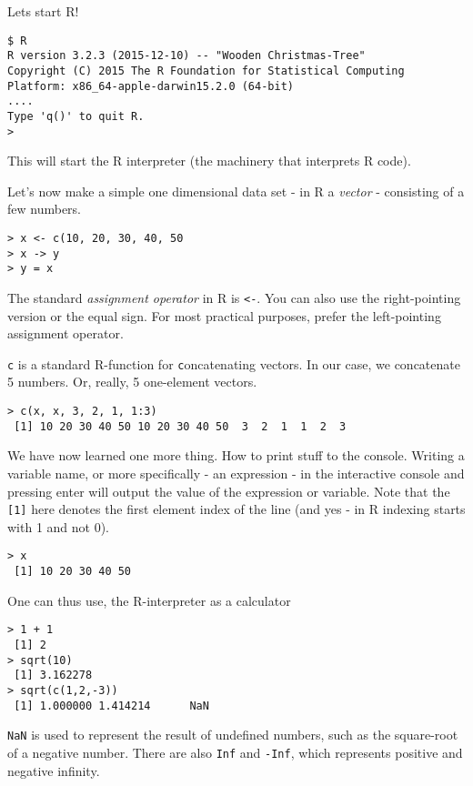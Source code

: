 \documentclass{article}[11pt]
\begin{document}
Lets start R!

\begin{verbatim}
$ R
R version 3.2.3 (2015-12-10) -- "Wooden Christmas-Tree"
Copyright (C) 2015 The R Foundation for Statistical Computing
Platform: x86_64-apple-darwin15.2.0 (64-bit)
....
Type 'q()' to quit R.
> 
\end{verbatim}

This will start the R interpreter (the machinery that interprets R code).

Let's now make a simple one dimensional data set - in R a
\emph{vector} - consisting of a few numbers.

\begin{verbatim}
> x <- c(10, 20, 30, 40, 50
> x -> y
> y = x
\end{verbatim}

The standard \emph{assignment operator} in R is \texttt{<-}. You can
also use the right-pointing version or the equal sign. For most
practical purposes, prefer the left-pointing assignment operator.

\texttt{c} is a standard R-function for \texttt{c}oncatenating vectors. In our case, we concatenate 5 numbers. Or, really, 5 one-element vectors.

\begin{verbatim}
> c(x, x, 3, 2, 1, 1:3)
 [1] 10 20 30 40 50 10 20 30 40 50  3  2  1  1  2  3
\end{verbatim}

We have now learned one more thing. How to print stuff to the
console. Writing a variable name, or more specifically - an expression
- in the interactive console and pressing enter will output the value
of the expression or variable. Note that the \texttt{[1]} here denotes
the first element index of the line (and yes - in R indexing starts
with 1 and not 0).

\begin{verbatim}
> x
 [1] 10 20 30 40 50
\end{verbatim}

One can thus use, the R-interpreter as a calculator

\begin{verbatim}
> 1 + 1
 [1] 2
> sqrt(10)
 [1] 3.162278
> sqrt(c(1,2,-3))
 [1] 1.000000 1.414214      NaN
\end{verbatim}


\texttt{NaN} is used to represent the result of undefined numbers,
such as the square-root of a negative number. There are also
\texttt{Inf} and \texttt{-Inf}, which represents positive and negative infinity.
\end{document}
